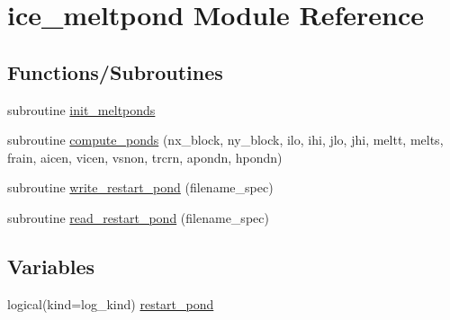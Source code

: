 \hypertarget{namespaceice__meltpond}{
\section{ice\_\-meltpond Module Reference}
\label{namespaceice__meltpond}
}
\subsection*{Functions/Subroutines}
\begin{DoxyCompactItemize}
\item 
subroutine \hyperlink{namespaceice__meltpond_ac0d35a10ba7a39add524e51b1964a451}{init\_\-meltponds}
\item 
subroutine \hyperlink{namespaceice__meltpond_a2d66a4a7c6f08732259cd3bd80998c9a}{compute\_\-ponds} (nx\_\-block, ny\_\-block, ilo, ihi, jlo, jhi, meltt, melts, frain, aicen, vicen, vsnon, trcrn, apondn, hpondn)
\item 
subroutine \hyperlink{namespaceice__meltpond_a18dd3b2ba6582ac028a021de32f0e014}{write\_\-restart\_\-pond} (filename\_\-spec)
\item 
subroutine \hyperlink{namespaceice__meltpond_abc1500e180d1775374ecff960c8ec825}{read\_\-restart\_\-pond} (filename\_\-spec)
\end{DoxyCompactItemize}
\subsection*{Variables}
\begin{DoxyCompactItemize}
\item 
logical(kind=log\_\-kind) \hyperlink{namespaceice__meltpond_a5f576379fa33029c540bd3b3474f45c1}{restart\_\-pond}
\end{DoxyCompactItemize}


